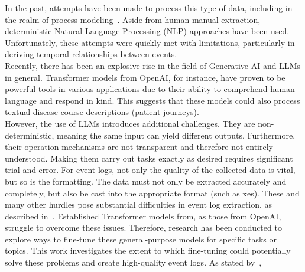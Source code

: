In the past, attempts have been made to process this type of data, including in the realm of process modeling~\cite{friedrich_process_2011}. Aside from  human manual extraction,  deterministic Natural Language Processing (NLP) approaches have been used. Unfortunately, these attempts were quickly met with limitations, particularly in deriving temporal relationships between events.\\
Recently, there has been an explosive rise in the field of Generative AI and LLMs in general. Transformer models from OpenAI, for instance, have proven to be powerful tools in various applications due to their ability to comprehend human language and respond in kind. This suggests that these models could also process textual disease course descriptions (patient journeys).\\
However, the use of LLMs introduces additional challenges. They are non-deterministic, meaning the same input can yield different outputs. Furthermore, their operation mechanisms are not transparent and therefore not entirely understood. Making them carry out tasks exactly as desired requires significant trial and error. For event logs, not only the quality of the collected data is vital, but so is the formatting. The data must not only be extracted accurately and completely, but also be cast into the appropriate format (such as xes).
These and many other hurdles pose substantial difficulties in event log extraction, as described in~\cite{munoz-gama_process_2022}. Established Transformer models from, as those from OpenAI, struggle to overcome these issues. Therefore, research has been conducted to explore ways to fine-tune these general-purpose models for specific tasks or topics. This work investigates the extent to which fine-tuning could potentially solve these problems and create high-quality event logs. As stated by~\cite{latif_fine-tuning_2024}, 
\begin{quote}
\end{quote}